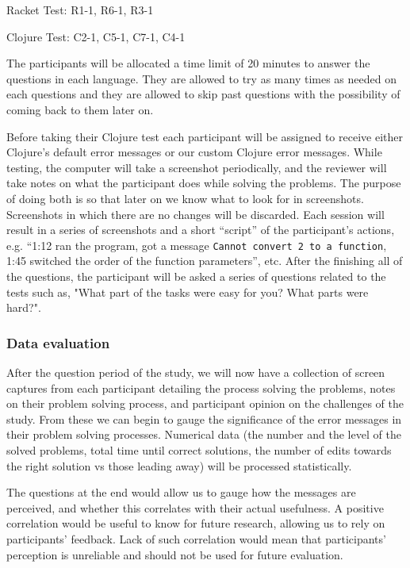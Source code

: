 \documentclass[12pt]{article}
\begin{document}
Racket Test: R1-1, R6-1, R3-1

Clojure Test: C2-1, C5-1, C7-1, C4-1


	The participants will be allocated a time limit of 20 minutes to answer the questions in each language. 
They are allowed to try as many times as needed on each questions and they are allowed to skip past questions with the possibility of coming back to them later on. 

Before taking their Clojure test each participant will  be assigned to receive either Clojure's default error messages or our custom Clojure error messages.
While testing, the computer will take a screenshot periodically, and the reviewer will take notes on what the participant does while solving the problems.
The purpose of doing both is so that later on we know what to look for in screenshots. Screenshots in which there are no changes will be discarded. 
Each session will result in a series of screenshots and a short ``script'' of the participant's actions, e.g. ``1:12 ran the program, got a message \texttt{Cannot convert 2 to a function}, 1:45 switched the order of the function parameters'', etc.
After the finishing all of the questions, the participant will be asked a series of questions related to the tests such as, "What part of the tasks were easy for you? What parts were hard?".

\subsubsection{Data evaluation}\label{subsec:evaluation}

After the question period of the study, we will now have a collection of screen captures from each participant detailing the process solving the problems, notes on their problem solving process, and participant opinion on the challenges of the study.
From these we can begin to gauge the significance of the error messages in their problem solving processes. 
Numerical data (the number and the level of the solved problems, total time until correct solutions, the number of edits towards the right solution vs those leading away) will be processed statistically. 

The questions at the end would allow us to gauge how the messages are perceived, and whether this correlates with their actual usefulness. A positive correlation would be useful to know for future research, allowing us to rely on participants' feedback. 
Lack of such correlation would mean that participants' perception is unreliable and should not be used for future evaluation.  
\end{document}
